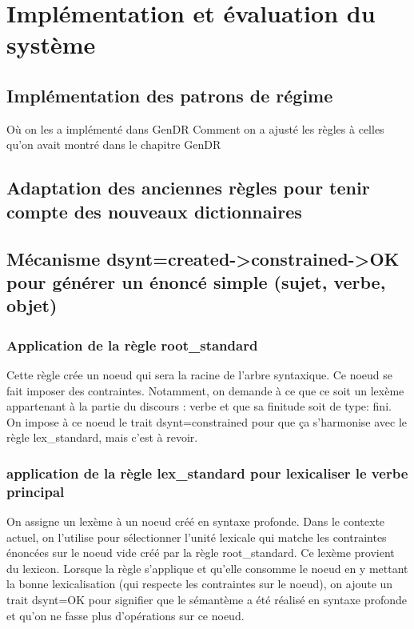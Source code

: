 \chapter{Implémentation et évaluation du système}

\section{Implémentation des patrons de régime}
Où on les a implémenté dans GenDR
Comment on a ajusté les règles à celles qu'on avait montré dans le chapitre GenDR

\section{Adaptation des anciennes règles pour tenir compte des nouveaux dictionnaires}
\section{Mécanisme dsynt=created->constrained->OK pour générer un énoncé simple (sujet, verbe, objet)}

\subsection{Application de la règle root{\_}standard}
Cette règle crée un noeud qui sera la racine de l'arbre syntaxique. Ce noeud se fait imposer des contraintes. Notamment, on demande à ce que ce soit un lexème appartenant à la partie du discours : verbe et que sa finitude soit de type: fini. On impose à ce noeud le trait dsynt=constrained pour que ça s'harmonise avec le règle lex{\_}standard, mais c'est à revoir.

\subsection{application de la règle lex{\_}standard pour lexicaliser le verbe principal}
On assigne un lexème à un noeud  créé en syntaxe profonde. Dans le contexte actuel, on l'utilise pour sélectionner l'unité lexicale qui matche les contraintes énoncées sur le noeud vide créé par la règle root{\_}standard. Ce lexème provient du lexicon. Lorsque la règle s'applique et qu'elle consomme le noeud en y mettant la bonne lexicalisation (qui respecte les contraintes sur le noeud), on ajoute un trait dsynt=OK pour signifier que le sémantème a été réalisé en syntaxe profonde et qu'on ne fasse plus d'opérations sur ce noeud.

